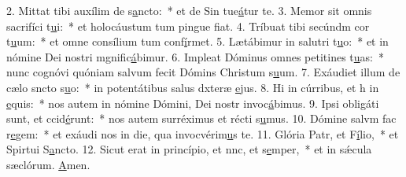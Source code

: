 2. Mittat tibi auxílim de s\uline{a}ncto:~* et de Sin tue\uline{á}tur te.
3. Memor sit omnis sacrifíci t\uline{u}i:~* et holocáustum tum pingue f\uline{i}at.
4. Tríbuat tibi secúndm cor t\uline{u}um:~* et omne consílium tum conf\uline{í}rmet.
5. Lætábimur in salutri t\uline{u}o:~* et in nómine Dei nostri mgnific\uline{á}bimur.
6. Impleat Dóminus omnes petitines t\uline{u}as:~* nunc cognóvi quóniam salvum fecit Dómins Christum s\uline{u}um.
7. Exáudiet illum de cælo sncto s\uline{u}o:~* in potentátibus salus dxteræ \uline{e}jus.
8. Hi in cúrribus, et h in \uline{e}quis:~* nos autem in nómine Dómini, Dei nostr invoc\uline{á}bimus.
9. Ipsi obligáti sunt, et ccid\uline{é}runt:~* nos autem surréximus et récti s\uline{u}mus.
10. Dómine salvm fac r\uline{e}gem:~* et exáudi nos in die, qua invocvérim\uline{u}s te.
11. Glória Patr, et F\uline{í}lio,~* et Spirtui S\uline{a}ncto.
12. Sicut erat in princípio, et nnc, et s\uline{e}mper,~* et in sǽcula sæclórum. \uline{A}men.

